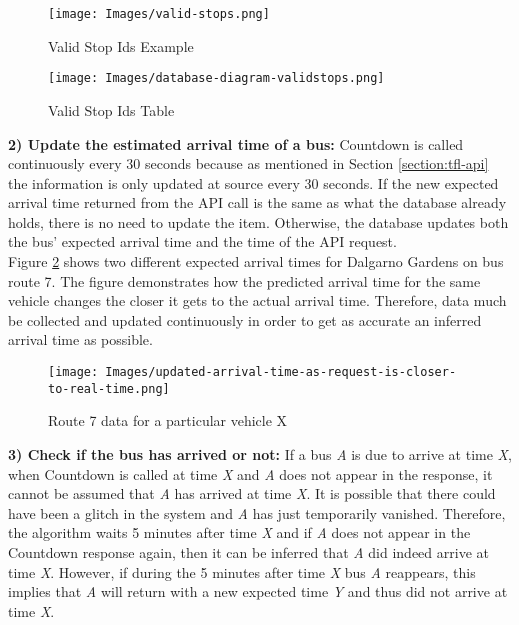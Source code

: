 \begin{figure}[H]
\centering
\begin{minipage}{.65\textwidth}
  \centering
  \texttt{[image: Images/valid-stops.png]}
  \caption{Valid Stop Ids Example}
  \label{fig:valid-stops-db}
\end{minipage}%
\begin{minipage}{.35\textwidth}
  \centering
  \texttt{[image: Images/database-diagram-validstops.png]}
  \caption{Valid Stop Ids Table}
  \label{fig:valid-stops-db-design}
\end{minipage}
\end{figure}

\textbf{2) Update the estimated arrival time of a bus: } Countdown is called continuously every 30 seconds because as mentioned in Section \ref{section:tfl-api} the information is only updated at source every 30 seconds. If the new expected arrival time returned from the API call is the same as what the database already holds, there is no need to update the item. Otherwise, the database updates both the bus' expected arrival time and the time of the API request. \\

Figure \ref{fig:more-accurate-closer-to-eta} shows two different expected arrival times for Dalgarno Gardens on bus route 7. The figure demonstrates how the predicted arrival time for the same vehicle changes the closer it gets to the actual arrival time. Therefore, data much be collected and updated continuously in order to get as accurate an inferred arrival time as possible.

\begin{figure}[H]
\begin{center}
    \texttt{[image: Images/updated-arrival-time-as-request-is-closer-to-real-time.png]}
    \caption{Route 7 data for a particular vehicle X}
    \label{fig:more-accurate-closer-to-eta}
\end{center}
\end{figure}

\textbf{3) Check if the bus has arrived or not: } If a bus \textit{A} is due to arrive at time \textit{X}, when Countdown is called at time \textit{X} and \textit{A} does not appear in the response, it cannot be assumed that \textit{A} has arrived at time \textit{X}. It is possible that there could have been a glitch in the system and \textit{A} has just temporarily vanished. Therefore, the algorithm waits 5 minutes after time \textit{X} and if \textit{A} does not appear in the Countdown response again, then it can be inferred that \textit{A} did indeed arrive at time \textit{X}. However, if during the 5 minutes after time \textit{X} bus  \textit{A} reappears, this implies that \textit{A} will return with a new expected time \textit{Y} and thus did not arrive at time \textit{X}. \\

